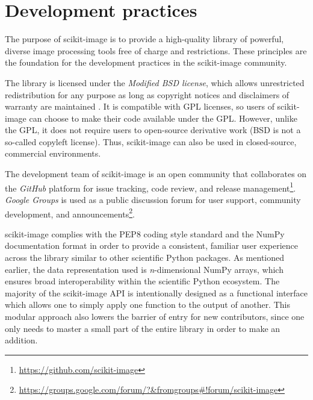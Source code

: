 
\section*{Development practices}
  \label{sec:development-practices}

  The purpose of scikit-image is to provide a high-quality library of powerful, diverse image processing tools free of charge and restrictions. These principles are the foundation for the development practices in the scikit-image community.

  The library is licensed under the \emph{Modified BSD license}, which allows unrestricted redistribution for any purpose as long as copyright notices and disclaimers of warranty are maintained \citep{BSD}. It is compatible with GPL licenses, so users of scikit-image can choose to make their code available under the GPL. However, unlike the GPL, it does not require users to open-source derivative work (BSD is not a so-called copyleft license). Thus, scikit-image can also be used in closed-source, commercial environments.

  The development team of scikit-image is an open community that collaborates on the \emph{GitHub} platform for issue tracking, code review, and release management\footnote{\url{https://github.com/scikit-image}}. \emph{Google Groups} is used as a public discussion forum for user support, community development, and announcements\footnote{\url{https://groups.google.com/forum/?&fromgroups\#!forum/scikit-image}}.

  scikit-image complies with the PEP8 coding style standard \citep{PEP8} and the NumPy documentation format \citep{NumpyDoc} in order to provide a consistent, familiar user experience across the library similar to other scientific Python packages. As mentioned earlier, the data representation used is \emph{n}-dimensional NumPy arrays, which ensures broad interoperability within the scientific Python ecosystem. The majority of the scikit-image API is intentionally designed as a functional interface which allows one to simply apply one function to the output of another. This modular approach also lowers the barrier of entry for new contributors, since one only needs to master a small part of the entire library in order to make an addition.


